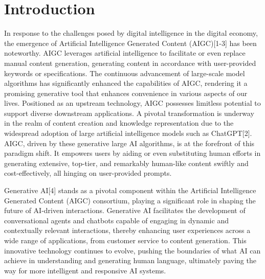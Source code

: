 \documentclass[conference]{IEEEtran}
\begin{document}
\section{Introduction}

In response to the challenges posed by digital intelligence in the digital economy, the emergence of Artificial Intelligence Generated Content (AIGC)[1-3] has been noteworthy. AIGC leverages artificial intelligence to facilitate or even replace manual content generation, generating content in accordance with user-provided keywords or specifications. The continuous advancement of large-scale model algorithms has significantly enhanced the capabilities of AIGC, rendering it a promising generative tool that enhances convenience in various aspects of our lives. Positioned as an upstream technology, AIGC possesses limitless potential to support diverse downstream applications. A pivotal transformation is underway in the realm of content creation and knowledge representation due to the widespread adoption of large artificial intelligence models such as ChatGPT[2]. AIGC, driven by these generative large AI algorithms, is at the forefront of this paradigm shift. It empowers users by aiding or even substituting human efforts in generating extensive, top-tier, and remarkably human-like content swiftly and cost-effectively, all hinging on user-provided prompts. 

\baselineskip

Generative AI[4] stands as a pivotal component within the Artificial Intelligence Generated Content (AIGC) consortium, playing a significant role in shaping the future of AI-driven interactions. Generative AI facilitates the development of conversational agents and chatbots capable of engaging in dynamic and contextually relevant interactions, thereby enhancing user experiences across a wide range of applications, from customer service to content generation. This innovative technology continues to evolve, pushing the boundaries of what AI can achieve in understanding and generating human language, ultimately paving the way for more intelligent and responsive AI systems.
\end{document}

